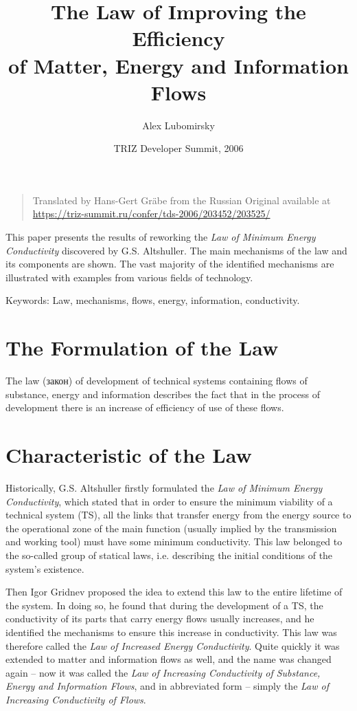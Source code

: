 \documentclass[a4paper,11pt]{article}
\author{Alex Lubomirsky}
\title{The Law of Improving the Efficiency\\ of Matter, Energy and Information
  Flows}
\date{TRIZ Developer Summit, 2006}
\begin{document}
\maketitle

\begin{quote}
  Translated by Hans-Gert Gräbe from the Russian Original available at\\
  \url{https://triz-summit.ru/confer/tds-2006/203452/203525/} 
\end{quote}

This paper presents the results of reworking the \emph{Law of Minimum Energy
  Conductivity} discovered by G.S. Altshuller.  The main mechanisms of the law
and its components are shown. The vast majority of the identified mechanisms
are illustrated with examples from various fields of technology.

Keywords: Law, mechanisms, flows, energy, information, conductivity.

\section*{The Formulation of the Law}

The law (\foreignlanguage{russian}{закон}) of development of technical systems
containing flows of substance, energy and information describes the fact that
in the process of development there is an increase of efficiency of use of
these flows.

\section*{Characteristic of the Law}

Historically, G.S. Altshuller firstly formulated the \emph{Law of Minimum
  Energy Conductivity}, which stated that in order to ensure the minimum
viability of a technical system (TS), all the links that transfer energy from
the energy source to the operational zone of the main function (usually
implied by the transmission and working tool) must have some minimum
conductivity. This law belonged to the so-called group of statical laws,
i.e. describing the initial conditions of the system's existence.

Then Igor Gridnev proposed the idea to extend this law to the entire lifetime
of the system. In doing so, he found that during the development of a TS, the
conductivity of its parts that carry energy flows usually increases, and he
identified the mechanisms to ensure this increase in conductivity. This law
was therefore called the \emph{Law of Increased Energy Conductivity}. Quite
quickly it was extended to matter and information flows as well, and the name
was changed again -- now it was called the \emph{Law of Increasing
  Conductivity of Substance, Energy and Information Flows}, and in abbreviated
form -- simply the \emph{Law of Increasing Conductivity of Flows}.
\end{document}

